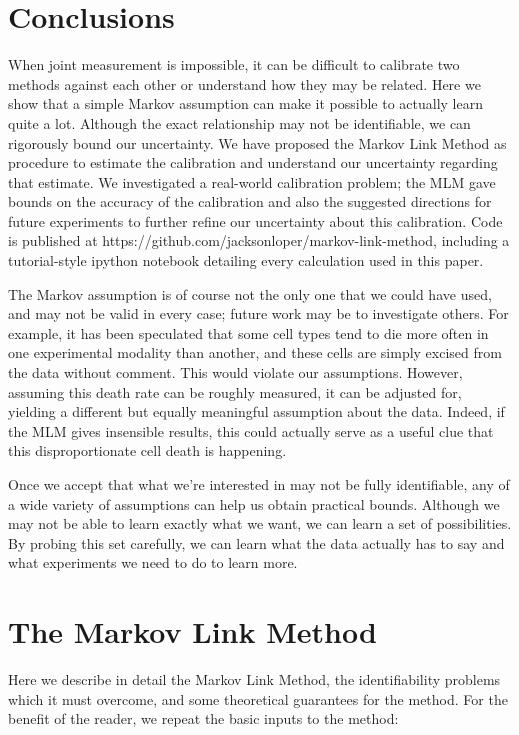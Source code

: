 \section{Conclusions}

When joint measurement is impossible, it can be difficult to calibrate two methods against each other or understand how they may be related.  Here we show that a simple Markov assumption can make it possible to actually learn quite a lot.  Although the exact relationship may not be identifiable, we can rigorously bound our uncertainty.  We have proposed the Markov Link Method as procedure to estimate the calibration and understand our uncertainty regarding that estimate.  We investigated a real-world calibration problem; the MLM gave bounds on the accuracy of the calibration and also the suggested directions for future experiments to further refine our uncertainty about this calibration.  Code is published at https://github.com/jacksonloper/markov-link-method, including a tutorial-style ipython notebook detailing every calculation used in this paper.

The Markov assumption is of course not the only one that we could have used, and may not be valid in every case; future work may be to investigate others.  For example, it has been speculated that some cell types tend to die more often in one experimental modality than another, and these cells are simply excised from the data without comment.  This would violate our assumptions.  However, assuming this death rate can be roughly measured, it can be adjusted for, yielding a different but equally meaningful assumption about the data.  Indeed, if the MLM gives insensible results, this could actually serve as a useful clue that this disproportionate cell death is happening.

Once we accept that what we're interested in may not be fully identifiable, any of a wide variety of assumptions can help us obtain practical bounds.  Although we may not be able to learn exactly what we want, we can learn a set of possibilities.  By probing this set carefully, we can learn what the data actually has to say and what experiments we need to do to learn more.

\section{The Markov Link Method}

\label{sec:mlm}

Here we describe in detail the Markov Link Method, the identifiability problems which it must overcome, and some theoretical guarantees for the method.  For the benefit of the reader, we repeat the basic inputs to the method:


